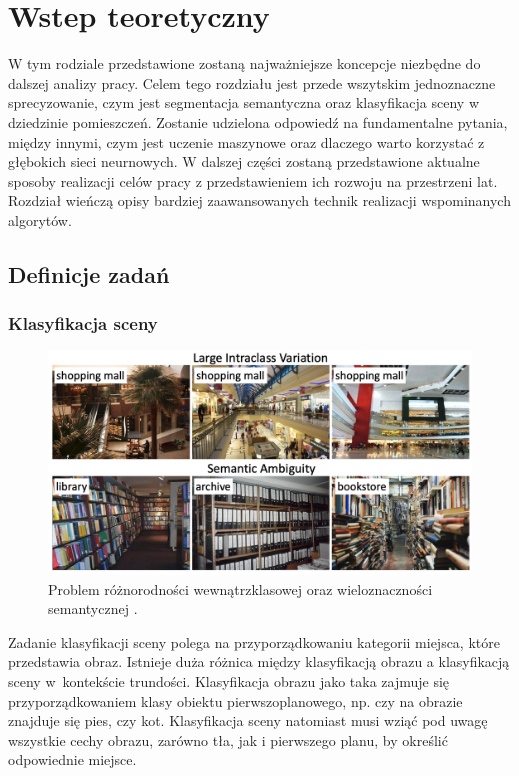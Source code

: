 \newpage %
\section{Wstep teoretyczny}
W tym rodziale przedstawione zostaną najważniejsze koncepcje niezbędne do dalszej analizy pracy. Celem tego rozdziału jest przede wszytskim jednoznaczne sprecyzowanie, czym jest segmentacja semantyczna oraz klasyfikacja sceny w dziedzinie pomieszczeń. Zostanie udzielona odpowiedź na fundamentalne pytania, między innymi, czym jest uczenie maszynowe oraz dlaczego warto korzystać z głębokich sieci neurnowych. W dalszej części zostaną przedstawione aktualne sposoby realizacji celów pracy z przedstawieniem ich rozwoju na przestrzeni lat. Rozdział wieńczą opisy bardziej zaawansowanych technik realizacji wspominanych algorytów.
\subsection{Definicje zadań}
\subsubsection{Klasyfikacja sceny}
\begin{figure}[ht!]
    \includegraphics[width=\textwidth]{img/scene_class.png}
    \caption{Problem różnorodności wewnątrzklasowej oraz wieloznaczności semantycznej \cite{zeng2021deep}.}
    \label{fig:scene-class}
\end{figure}

Zadanie klasyfikacji sceny polega na przyporządkowaniu kategorii miejsca, które przedstawia obraz. Istnieje duża różnica między klasyfikacją obrazu a klasyfikacją sceny w~kontekście trundości. Klasyfikacja obrazu jako taka zajmuje się przyporządkowaniem klasy obiektu pierwszoplanowego, np. czy na obrazie znajduje się pies, czy kot. Klasyfikacja sceny natomiast musi wziąć pod uwagę wszystkie cechy obrazu, zarówno tła, jak i pierwszego planu, by określić odpowiednie miejsce. 

